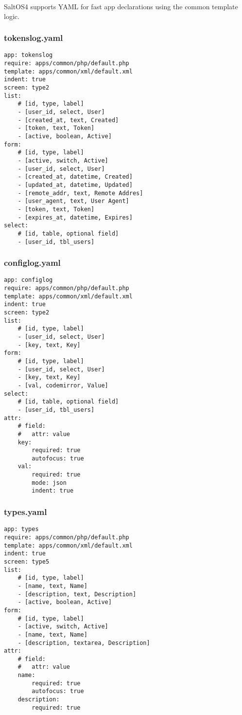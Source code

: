\documentclass[a4paper]{article}
\begin{document}
SaltOS4 supports YAML for fast app declarations using the common template logic.

\hypertarget{toc33}{}
\subsubsection{tokenslog.yaml}

\begin{lstlisting}
app: tokenslog
require: apps/common/php/default.php
template: apps/common/xml/default.xml
indent: true
screen: type2
list:
    # [id, type, label]
    - [user_id, select, User]
    - [created_at, text, Created]
    - [token, text, Token]
    - [active, boolean, Active]
form:
    # [id, type, label]
    - [active, switch, Active]
    - [user_id, select, User]
    - [created_at, datetime, Created]
    - [updated_at, datetime, Updated]
    - [remote_addr, text, Remote Addres]
    - [user_agent, text, User Agent]
    - [token, text, Token]
    - [expires_at, datetime, Expires]
select:
    # [id, table, optional field]
    - [user_id, tbl_users]
\end{lstlisting}

\hypertarget{toc34}{}
\subsubsection{configlog.yaml}

\begin{lstlisting}
app: configlog
require: apps/common/php/default.php
template: apps/common/xml/default.xml
indent: true
screen: type2
list:
    # [id, type, label]
    - [user_id, select, User]
    - [key, text, Key]
form:
    # [id, type, label]
    - [user_id, select, User]
    - [key, text, Key]
    - [val, codemirror, Value]
select:
    # [id, table, optional field]
    - [user_id, tbl_users]
attr:
    # field:
    #   attr: value
    key:
        required: true
        autofocus: true
    val:
        required: true
        mode: json
        indent: true
\end{lstlisting}

\hypertarget{toc35}{}
\subsubsection{types.yaml}

\begin{lstlisting}
app: types
require: apps/common/php/default.php
template: apps/common/xml/default.xml
indent: true
screen: type5
list:
    # [id, type, label]
    - [name, text, Name]
    - [description, text, Description]
    - [active, boolean, Active]
form:
    # [id, type, label]
    - [active, switch, Active]
    - [name, text, Name]
    - [description, textarea, Description]
attr:
    # field:
    #   attr: value
    name:
        required: true
        autofocus: true
    description:
        required: true
\end{lstlisting}
\end{document}
